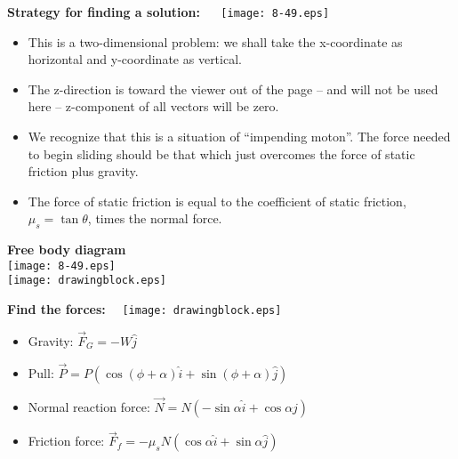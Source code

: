\documentclass{seminar}
\begin{document}
\begin{slide}
{\bf \blue Strategy for finding a solution:} ~~
\texttt{[image: 8-49.eps]}
\begin{itemize}
\item{}This is a two-dimensional problem:
we shall take the x-coordinate as horizontal and
y-coordinate as vertical.  
\item{}The z-direction is toward the
viewer out of the page -- and will not be used here -- z-component
of all vectors will be zero.
\item{}We recognize that this is a situation of ``impending moton''. 
The force needed to
begin sliding should be that which just overcomes the force of
static friction plus gravity.  
\item{}The force of static friction is equal to the
coefficient of static friction, $\mu_s=\tan\theta$, times
the normal force.
\vfill
\end{itemize}
\end{slide}



\begin{slide}
{\bf\blue Free body diagram}\\

\texttt{[image: 8-49.eps]}\\

\texttt{[image: drawingblock.eps]}


\vfill
\end{slide}




\begin{slide}
{\bf\blue Find the forces:}~~
\texttt{[image: drawingblock.eps]}\\
\begin{itemize}
\item{}Gravity: $\vec F_G = -W\hat j$
\item{}Pull:  $\vec P = P\left( \cos(\phi+\alpha)\hat i +
\sin(\phi+\alpha)\hat j\right)$
\item{}Normal reaction force: $\vec N = N\left( -\sin\alpha \hat i +
\cos\alpha\hat j\right)$
\item{}Friction force: $\vec F_f = -\mu_s N \left( \cos\alpha \hat i
+ \sin\alpha\hat j\right)$
\end{itemize}
\vfill
\end{slide}
\end{document}
